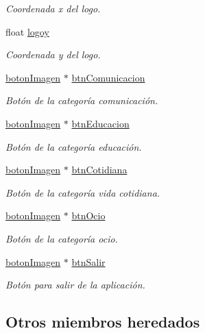 \begin{DoxyCompactItemize}
\begin{DoxyCompactList}\small\item\em Coordenada x del logo. \end{DoxyCompactList}\item 
float \hyperlink{classmenu_principal_a1f1f6764a1253e7fa12f9cee448f29b9}{logoy}
\begin{DoxyCompactList}\small\item\em Coordenada y del logo. \end{DoxyCompactList}\item 
\hyperlink{classboton_imagen}{boton\+Imagen} $\ast$ \hyperlink{classmenu_principal_a731ca834c77af1bade609b3bc28ab02c}{btn\+Comunicacion}
\begin{DoxyCompactList}\small\item\em Botón de la categoría comunicación. \end{DoxyCompactList}\item 
\hyperlink{classboton_imagen}{boton\+Imagen} $\ast$ \hyperlink{classmenu_principal_ab26a999803f322e9c9f05acd53125a8c}{btn\+Educacion}
\begin{DoxyCompactList}\small\item\em Botón de la categoría educación. \end{DoxyCompactList}\item 
\hyperlink{classboton_imagen}{boton\+Imagen} $\ast$ \hyperlink{classmenu_principal_a9c27d54b3333900acd941d889019ba1a}{btn\+Cotidiana}
\begin{DoxyCompactList}\small\item\em Botón de la categoría vida cotidiana. \end{DoxyCompactList}\item 
\hyperlink{classboton_imagen}{boton\+Imagen} $\ast$ \hyperlink{classmenu_principal_a488846721d51f37a0ce23bb19372c0b1}{btn\+Ocio}
\begin{DoxyCompactList}\small\item\em Botón de la categoría ocio. \end{DoxyCompactList}\item 
\hyperlink{classboton_imagen}{boton\+Imagen} $\ast$ \hyperlink{classmenu_principal_a9415d04ae2ac0a7927c32c95acdcb9ca}{btn\+Salir}
\begin{DoxyCompactList}\small\item\em Botón para salir de la aplicación. \end{DoxyCompactList}\end{DoxyCompactItemize}
\subsection*{Otros miembros heredados}


